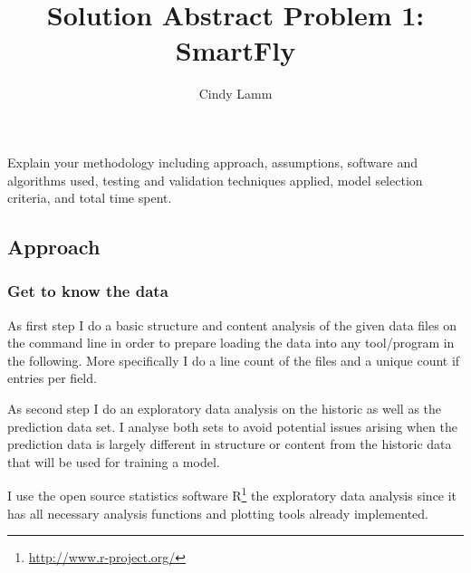 \documentclass[12pt,a4paper]{article}
\author{Cindy Lamm}
\title{Solution Abstract Problem 1: SmartFly}
\begin{document}
\maketitle

Explain your methodology including approach, assumptions, software and algorithms used, testing and validation techniques applied, model selection criteria, and total time spent.

\subsection{Approach}

\subsubsection{Get to know the data}

As first step I do a basic structure and content analysis of the given data files on the command line in order to prepare loading the data into any tool/program in the following. More specifically I do a line count of the files and a unique count if entries per field.

As second step I do an exploratory data analysis on the historic as well as the prediction data set. I analyse both sets to avoid potential issues arising when the prediction data is largely different in structure or content from the historic data that will be used for training a model. 

I use the open source statistics software R\footnote{\url{http://www.r-project.org/}} the exploratory data analysis since it has all necessary analysis functions and plotting tools already implemented.
\end{document}

